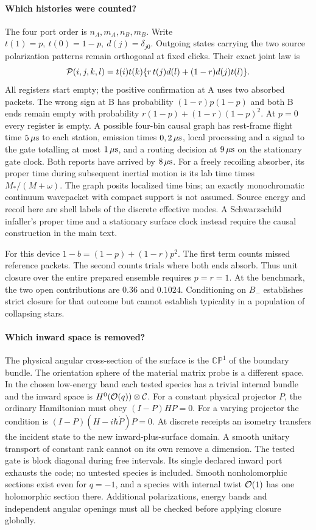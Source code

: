 \paragraph{Which histories were counted?}
The four port order is \(n_A,m_A,n_B,m_B\). Write \(t(1)=p,\ t(0)=1-p,\ d(j)=\delta_{j0}\). Outgoing states carrying the two source polarization patterns remain orthogonal at fixed clicks. Their exact joint law is
\[
 {\cal P}(i,j,k,l)=t(i)t(k)\{r\,t(j)d(l)+(1-r)d(j)t(l)\}.
\]
All registers start empty; the positive confirmation at A uses two absorbed packets. The wrong sign at B has probability \((1-r)p(1-p)\) and both B ends remain empty with probability \(r(1-p)+(1-r)(1-p)^2\). At \(p=0\) every register is empty. A possible four-bin causal graph has rest-frame flight time \(5\,\mu{\rm s}\) to each station, emission times \(0,2\,\mu{\rm s}\), local processing and a signal to the gate totalling at most \(1\,\mu{\rm s}\), and a routing decision at \(9\,\mu{\rm s}\) on the stationary gate clock. Both reports have arrived by \(8\,\mu{\rm s}\). For a freely recoiling absorber, its proper time during subsequent inertial motion is its lab time times \(M_* /(M+\omega)\). The graph posits localized time bins; an exactly monochromatic continuum wavepacket with compact support is not assumed. Source energy and recoil here are shell labels of the discrete effective modes. A Schwarzschild infaller's proper time and a stationary surface clock instead require the causal construction in the main text.

For this device \(1-b=(1-p)+(1-r)p^2\). The first term counts missed reference packets. The second counts trials where both ends absorb. Thus unit closure over the entire prepared ensemble requires \(p=r=1\). At the benchmark, the two open contributions are \(0.36\) and \(0.1024\). Conditioning on \(B_-\) establishes strict closure for that outcome but cannot establish typicality in a population of collapsing stars.

\paragraph{Which inward space is removed?}
The physical angular cross-section of the surface is the \(\mathbb{CP}^1\) of the boundary bundle. The orientation sphere of the material matrix probe is a different space. In the chosen low-energy band each tested species has a trivial internal bundle and the inward space is \(H^0({\cal O}(q))\otimes{\cal C}\). For a constant physical projector \(P\), the ordinary Hamiltonian must obey \((I-P)HP=0\). For a varying projector the condition is \((I-P)(H-i\hbar\dot P)P=0\). At discrete receipts an isometry transfers the incident state to the new inward-plus-surface domain. A smooth unitary transport of constant rank cannot on its own remove a dimension. The tested gate is block diagonal during free intervals. Its single declared inward port exhausts the code; no untested species is included. Smooth nonholomorphic sections exist even for \(q=-1\), and a species with internal twist \({\cal O}(1)\) has one holomorphic section there. Additional polarizations, energy bands and independent angular openings must all be checked before applying closure globally.


